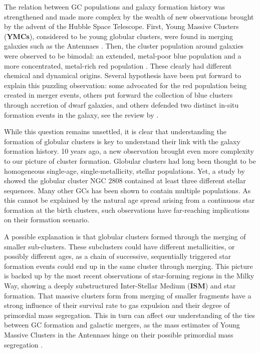 The relation between GC populations and galaxy formation history was strengthened and made more complex by the wealth of new observations brought by the advent of the Hubble Space Telescope. First, Young Massive Clusters (\textbf{YMCs}), considered to be young globular clusters, were found in merging galaxies such as the Antennaes \citep{Whitmore1995}. Then, the cluster population around galaxies were observed to be bimodal: an extended, metal-poor blue population and a more concentrated, metal-rich red population \citep{Zepf1993,Geisler1996}. These clearly had different chemical and dynamical origins. Several hypothesis have been put forward to explain this puzzling observation: some advocated for the red population being created in merger events, others put forward the collection of blue clusters through accretion of dwarf galaxies, and others defended two distinct in-situ formation events in the galaxy, see the review by \cite{Brodie2006}.


While this question remains unsettled, it is clear that understanding the formation of globular clusters is key to understand their link with the galaxy formation history. 10 years ago, a new observation brought even more complexity to our picture of cluster formation. Globular clusters had long been thought to be homogeneous single-age, single-metallicity, stellar populations. Yet, a study by \cite{Piotto2007} showed the globular cluster NGC 2808 contained at least three different stellar sequences. Many other GCs has been shown to contain multiple populations. As this cannot be explained by the natural age spread arising from a continuous star formation at the birth clusters, such observations have far-reaching implications on their formation scenario.

A possible explanation is that globular clusters formed through the merging of smaller sub-clusters. These subclusters could have different metallicities, or possibly different ages, as a chain of successive, sequentially triggered star formation events could end up in the same cluster through merging. This picture is backed up by the most recent observations of star-forming regions in the Milky Way, showing a deeply substructured Inter-Stellar Medium (\textbf{ISM}) and star formation. That massive clusters form from merging of smaller fragments have a strong influence of their survival rate to gas expulsion and their degree of primordial mass segregation. This in turn can affect our understanding of the ties between GC formation and galactic mergers, as the mass estimates of Young Massive Clusters in the Antennaes hinge on their possible primordial mass segregation \citep{McCrady2005}.

